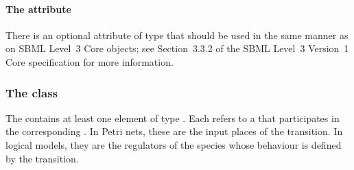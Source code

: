 \paragraph{The  attribute}
There is an optional  attribute of type  that should be used
in the same manner as on SBML Level~3 Core
objects; see Section~3.3.2 of the SBML Level~3 Version~1 Core
specification for more information.

%
%

\subsubsection{The  class}
\label{input-class}
The \ListOfInputs contains at least one element of type \Input. 
Each \Input refers to a \QualitativeSpecies that participates in the corresponding \Transition.
In Petri nets, these are the input places of the transition. In logical models, they are the regulators of the species whose behaviour is defined by the transition.


